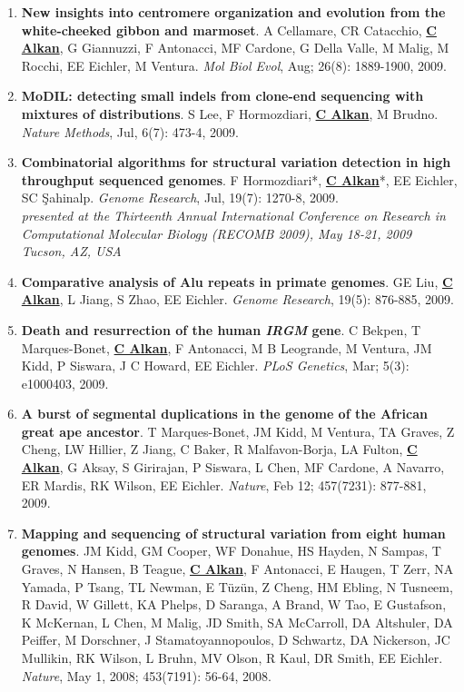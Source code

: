 \begin{enumerate}
\item
{\bf  New insights into centromere organization and evolution from the white-cheeked gibbon and marmoset}.
A Cellamare,    CR Catacchio,  {\bf \underline{C Alkan}}, G Giannuzzi, F Antonacci, MF Cardone, G Della Valle, M Malig, M Rocchi, EE Eichler, M Ventura.
{\em Mol Biol Evol}, Aug;  26(8): 1889-1900, 2009.

\item
{\bf MoDIL: detecting small indels from clone-end sequencing with mixtures of distributions}.
S Lee, F Hormozdiari, {\bf {\underline{C Alkan}}}, M Brudno.
{\em Nature Methods},  Jul, 6(7): 473-4, 2009.

\item
{\bf  Combinatorial algorithms for structural variation detection in high throughput sequenced genomes}.
F Hormozdiari*, {\bf {\underline{C Alkan}}}*, EE Eichler, SC \c{S}ahinalp. 
{\em Genome Research}, Jul, 19(7): 1270-8, 2009.\\
\hspace*{1cm} {\footnotesize {\it presented at the
 Thirteenth Annual International Conference on Research in Computational Molecular 
Biology (RECOMB 2009), May 18-21, 2009 Tucson, AZ, USA}}



\item

{\bf Comparative analysis of Alu repeats in primate genomes}.  GE Liu, {\bf {\underline{C Alkan}}}, L Jiang, S Zhao, EE Eichler. 
{\em Genome Research}, 19(5): 876-885, 2009.




\item
{\bf Death and resurrection of the human {\em IRGM} gene}. C Bekpen, T Marques-Bonet,
{\bf {\underline{C Alkan}}}, F Antonacci, M B Leogrande, M Ventura, JM Kidd, P Siswara, J C Howard, EE Eichler. {\em PLoS Genetics}, Mar;  5(3): e1000403, 2009.

\item

{\bf A burst of segmental duplications in the genome of the African great ape ancestor}. T Marques-Bonet, JM Kidd, M Ventura, TA Graves, Z Cheng, LW Hillier, Z Jiang, 
C Baker, R Malfavon-Borja, LA Fulton, {\bf {\underline{C Alkan}}}, G Aksay, S Girirajan,
 P Siswara, L Chen, MF Cardone, A Navarro, ER Mardis,
 RK Wilson, EE Eichler. {\em Nature}, Feb 12;  457(7231): 877-881, 2009.


\item
 {\bf Mapping and sequencing of structural variation from eight human genomes}.
 JM Kidd, GM Cooper, WF Donahue, HS Hayden, 
 N Sampas, T Graves, N Hansen, B Teague, {\bf {\underline{C Alkan}}},  F Antonacci, 
 E Haugen, T Zerr, NA Yamada, P Tsang,  TL Newman, E T\"{u}z\"{u}n, 
 Z Cheng, HM Ebling, N Tusneem, R David, W Gillett, KA Phelps, 
 D Saranga, A Brand, W Tao, E Gustafson, K McKernan, L Chen, 
 M Malig, JD Smith, SA McCarroll, DA Altshuler,  
 DA Peiffer, M Dorschner, J Stamatoyannopoulos, D Schwartz,  
 DA Nickerson, JC Mullikin, RK Wilson, L Bruhn, 
 MV Olson, R Kaul, DR Smith, EE Eichler.
 {\em Nature}, May 1, 2008;  453(7191): 56-64, 2008.



\end{enumerate}
